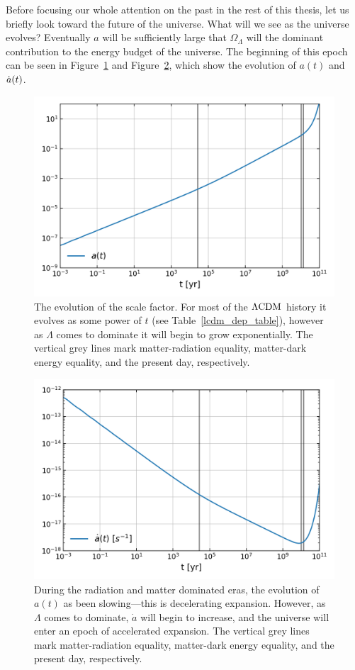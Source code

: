     Before focusing our whole attention on the past in the rest of this thesis, let us briefly
    look toward the future of the universe.
    What will we see as the universe evolves?
    Eventually $a$ will be
    sufficiently large that $\Omega_{\Lambda}$
    will the dominant contribution to the energy budget of the universe.
    The beginning of this epoch can be seen in Figure~\ref{fig:lcdm_a} and Figure~\ref{fig:lcdm_adot},
    which show the evolution of $a(t)$ and $\dot{a}(t)$.
\begin{figure}[h!]
\centering     %
    \includegraphics[width=.75\columnwidth]{plots/lcdm_a.png}
\caption{
    The evolution of the scale factor. For most of the $\Lambda\text{CDM}$ history
    it evolves as some power of $t$ (see Table~\ref{lcdm_dep_table}),
    however as $\Lambda$ comes to dominate
    it will begin to grow exponentially.
    The vertical grey lines mark matter-radiation equality, matter-dark energy equality,
    and the present day, respectively.
}\label{fig:lcdm_a}
\end{figure}
\begin{figure}[h!]
\centering     %
    \includegraphics[width=.75\columnwidth]{plots/lcdm_adot.png}
\caption{
    During the radiation and matter dominated eras, the evolution of
    $a(t)$ as been slowing---this is decelerating expansion.
    However, as $\Lambda$ comes to dominate,
    $\dot{a}$ will begin to increase, and the universe will enter
    an epoch of accelerated expansion.
    The vertical grey lines mark matter-radiation equality, matter-dark energy equality,
    and the present day, respectively.
}\label{fig:lcdm_adot}
\end{figure}


